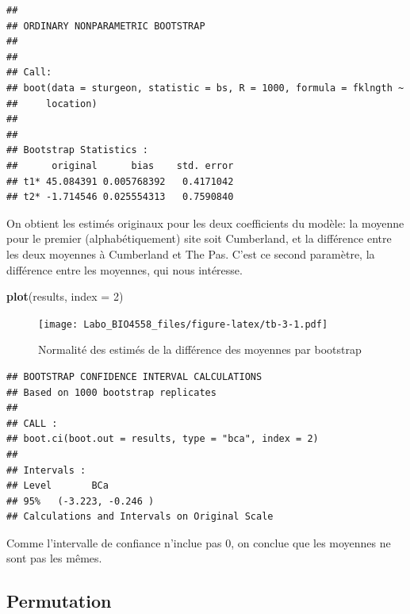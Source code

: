 \documentclass[12pt,]{book}
\newenvironment{Shaded}{\begin{snugshade}}{\end{snugshade}}
\newcommand{\CommentTok}[1]{\textcolor[rgb]{0.37,0.37,0.37}{\textit{#1}}}
\newcommand{\DataTypeTok}[1]{\textcolor[rgb]{0.27,0.27,0.27}{#1}}
\newcommand{\DecValTok}[1]{\textcolor[rgb]{0.06,0.06,0.06}{#1}}
\newcommand{\KeywordTok}[1]{\textcolor[rgb]{0.27,0.27,0.27}{\textbf{#1}}}
\newcommand{\NormalTok}[1]{#1}
\newcommand{\StringTok}[1]{\textcolor[rgb]{0.5,0.5,0.5}{#1}}
\begin{document}
\begin{verbatim}
## 
## ORDINARY NONPARAMETRIC BOOTSTRAP
## 
## 
## Call:
## boot(data = sturgeon, statistic = bs, R = 1000, formula = fklngth ~ 
##     location)
## 
## 
## Bootstrap Statistics :
##      original      bias    std. error
## t1* 45.084391 0.005768392   0.4171042
## t2* -1.714546 0.025554313   0.7590840
\end{verbatim}

On obtient les estimés originaux pour les deux coefficients du modèle: la moyenne pour le premier (alphabétiquement) site soit Cumberland, et la différence entre les deux moyennes à Cumberland et The Pas. C'est ce second paramètre, la différence entre les moyennes, qui nous intéresse.

\begin{Shaded}
\begin{Highlighting}[]
\KeywordTok{plot}\NormalTok{(results, }\DataTypeTok{index =} \DecValTok{2}\NormalTok{)}
\end{Highlighting}
\end{Shaded}

\begin{figure}
\centering
\texttt{[image: Labo\_BIO4558\_files/figure-latex/tb-3-1.pdf]}
\caption{\label{fig:tb-3}Normalité des estimés de la différence des moyennes par bootstrap}
\end{figure}

\begin{Shaded}
\end{Shaded}

\begin{verbatim}
## BOOTSTRAP CONFIDENCE INTERVAL CALCULATIONS
## Based on 1000 bootstrap replicates
## 
## CALL : 
## boot.ci(boot.out = results, type = "bca", index = 2)
## 
## Intervals : 
## Level       BCa          
## 95%   (-3.223, -0.246 )  
## Calculations and Intervals on Original Scale
\end{verbatim}

Comme l'intervalle de confiance n'inclue pas 0, on conclue que les moyennes ne sont pas les mêmes.

\hypertarget{permutation}{%
\subsection{Permutation}\label{permutation}}
\end{document}
